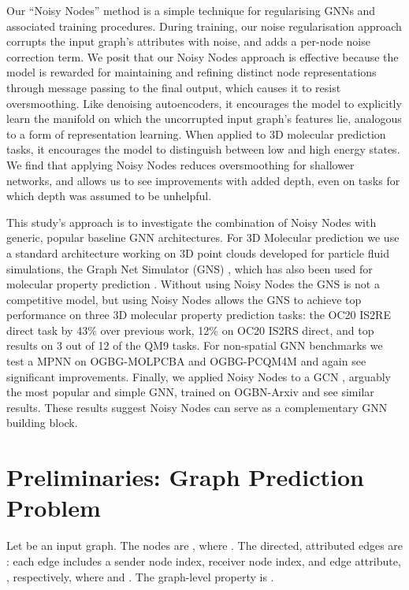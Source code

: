 \documentclass{article} \usepackage{iclr2022_conference,times}
\begin{document}
Our ``Noisy Nodes'' method is a simple technique for regularising GNNs and associated training procedures.
During training, our noise regularisation approach corrupts the input graph's attributes with noise, and adds a per-node noise correction term. We posit that our Noisy Nodes approach is effective because the model is rewarded for maintaining and refining distinct node representations through message passing to the final output, which causes it to resist oversmoothing. Like denoising autoencoders, it encourages the model to explicitly learn the manifold on which the uncorrupted input graph's features lie, analogous to a form of representation learning. When applied to 3D molecular prediction tasks, it encourages the model to distinguish between low and high energy states. We find that applying Noisy Nodes reduces oversmoothing for shallower networks, and allows us to see improvements with added depth, even on tasks for which depth was assumed to be unhelpful.

This study's approach is to investigate the combination of Noisy Nodes with generic, popular baseline GNN architectures. For 3D Molecular prediction we use a standard architecture working on 3D point clouds developed for particle fluid simulations, the Graph Net Simulator (GNS) \citep{pmlr-v119-sanchez-gonzalez20a}, which has also been used for molecular property prediction \citep{Hu2021ForceNetAG}. Without using Noisy Nodes the GNS is not a competitive model, but using Noisy Nodes allows the GNS to achieve top performance on three 3D molecular property prediction tasks: the OC20 IS2RE direct task by 43\% over previous work, 12\% on OC20 IS2RS direct, and top results on 3 out of 12 of the QM9 tasks. For non-spatial GNN benchmarks we test a MPNN \citep{Gilmer2017NeuralMP} on OGBG-MOLPCBA and OGBG-PCQM4M \citep{hu2021ogblsc} and again see significant improvements. Finally, we applied Noisy Nodes to a GCN \citep{Kipf2016GCN}, arguably the most popular and simple GNN, trained on OGBN-Arxiv and see similar results. These results suggest Noisy Nodes can serve as a complementary GNN building block.

\section{Preliminaries: Graph Prediction Problem}

Let  be an input graph. The nodes are , where . The directed, attributed edges are : each edge includes a sender node index, receiver node index, and edge attribute, , respectively, where  and . The graph-level property is . 
\end{document}
